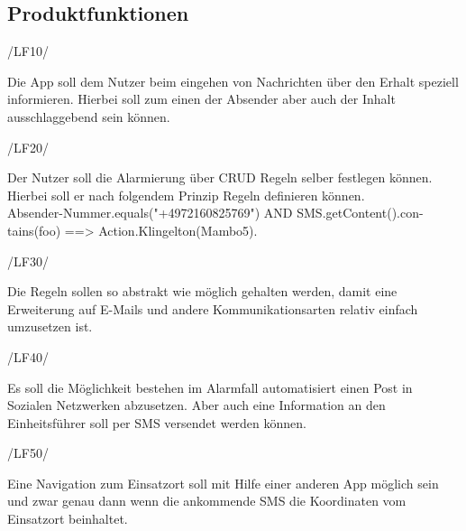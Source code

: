 \subsection{Produktfunktionen}
\begin{minipage}{3cm}
/LF10/
\end{minipage}
\begin{minipage}{13cm}
Die App soll dem Nutzer beim eingehen von Nachrichten \"uber den Erhalt speziell informieren. Hierbei soll zum einen der Absender aber auch der Inhalt ausschlaggebend sein k\"onnen.\\
\end{minipage}
\begin{minipage}{3cm}
/LF20/
\end{minipage}
\begin{minipage}{13cm}
Der Nutzer soll die Alarmierung \"uber CRUD Regeln selber festlegen k\"onnen. Hierbei soll er nach folgendem Prinzip Regeln definieren k\"onnen.\\
Absender-Nummer.equals("+4972160825769") AND SMS.getContent().con-tains(foo)
==> Action.Klingelton(Mambo5).\\
\end{minipage}
\begin{minipage}{3cm}
/LF30/
\end{minipage}
\begin{minipage}{13cm}
Die Regeln sollen so abstrakt wie m\"oglich gehalten werden, damit eine Erweiterung auf E-Mails und andere Kommunikationsarten relativ einfach umzusetzen ist.\\
\end{minipage}
\begin{minipage}{3cm}
/LF40/
\end{minipage}
\begin{minipage}{13cm}
Es soll die M\"oglichkeit bestehen im Alarmfall automatisiert einen Post in Sozialen Netzwerken abzusetzen. Aber auch eine Information an den Einheitsf\"uhrer soll per SMS versendet werden k\"onnen.\\
\end{minipage}
\begin{minipage}{3cm}
/LF50/
\end{minipage}
\begin{minipage}{13cm}
Eine Navigation zum Einsatzort soll mit Hilfe einer anderen App m\"oglich sein und zwar genau dann wenn die ankommende SMS die Koordinaten vom Einsatzort beinhaltet.\\
\end{minipage}

